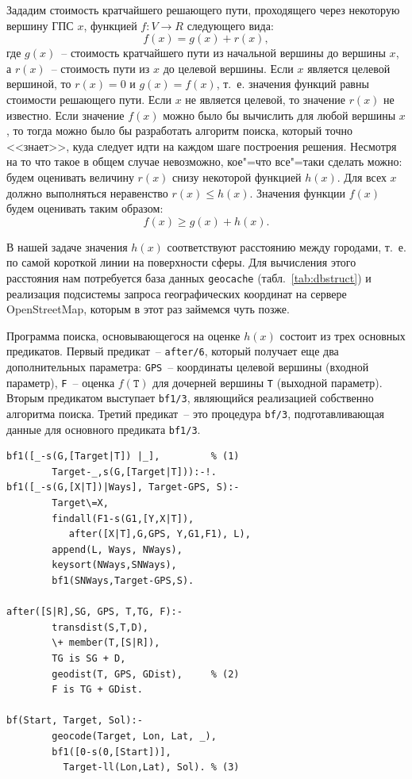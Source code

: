 \documentclass[a4paper,14pt, openany, twoside, final]{extbook} %
\begin{document}
Зададим стоимость кратчайшего решающего пути, проходящего через некоторую вершину ГПС $x$, функцией $f\!\!:V\to R$ следующего вида:
\begin{equation}
  \label{eq:1}
  f(x)=g(x)+r(x),
\end{equation}
где $g(x)$~-- стоимость кратчайшего пути из начальной вершины до вершины $x$, а $r(x)$~-- стоимость пути из $x$ до целевой вершины.  Если $x$ является целевой вершиной, то $r(x)=0$ и $g(x)=f(x)$, т.~е. значения функций равны стоимости решающего пути.  Если $x$ не является целевой, то значение $r(x)$ не известно.  Если значение $f(x)$ можно было бы вычислить для любой вершины $x$, то тогда можно было бы разработать алгоритм поиска, который точно <<знает>>, куда следует идти на каждом шаге построения решения.  Несмотря на то что такое в общем случае невозможно, кое"=что все"=таки сделать можно: будем оценивать величину $r(x)$ снизу некоторой функцией $h(x)$.  Для всех $x$ должно выполняться неравенство $r(x)\leqslant h(x)$.  Значения функции $f(x)$ будем оценивать таким образом:
\begin{equation}
  \label{eq:2}
  f(x)\geqslant g(x)+h(x).
\end{equation}

В нашей задаче значения $h(x)$ соответствуют расстоянию между городами, т.~е. по самой короткой линии на поверхности сферы.  Для вычисления этого расстояния нам потребуется база данных \texttt{geocache} (табл.~\ref{tab:dbstruct}) и реализация подсистемы запроса географических координат на сервере \foreignlanguage{english}{OpenStreetMap}, которым в этот раз займемся чуть позже.

Программа поиска, основывающегося на оценке $h(x)$ состоит из трех основных предикатов.  Первый предикат~-- \texttt{after/6}, который получает еще два дополнительных параметра: \texttt{GPS}~-- координаты целевой вершины (входной параметр), \texttt{F}~-- оценка $f(\mathtt{T})$ для дочерней вершины \texttt{T} (выходной параметр).  Вторым предикатом выступает \texttt{bf1/3}, являющийся реализацией собственно алгоритма поиска.  Третий предикат~-- это процедура \texttt{bf/3}, подготавливающая данные для основного предиката \texttt{bf1/3}.

\begin{verbatim}
bf1([_-s(G,[Target|T]) |_],         % (1)
        Target-_,s(G,[Target|T])):-!.
bf1([_-s(G,[X|T])|Ways], Target-GPS, S):-
        Target\=X,
        findall(F1-s(G1,[Y,X|T]),
           after([X|T],G,GPS, Y,G1,F1), L),
        append(L, Ways, NWays),
        keysort(NWays,SNWays),
        bf1(SNWays,Target-GPS,S).

after([S|R],SG, GPS, T,TG, F):-
        transdist(S,T,D),
        \+ member(T,[S|R]),
        TG is SG + D,
        geodist(T, GPS, GDist),     % (2)
        F is TG + GDist.

bf(Start, Target, Sol):-
        geocode(Target, Lon, Lat, _),
        bf1([0-s(0,[Start])],
          Target-ll(Lon,Lat), Sol). % (3)
\end{verbatim}
\end{document}
